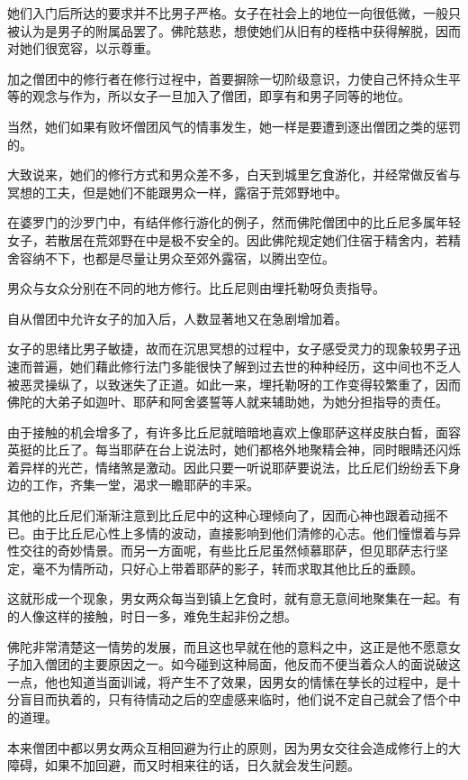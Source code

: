 \documentclass[twoside,openany]{book}
\begin{document}
她们入门后所达的要求并不比男子严格。女子在社会上的地位一向很低微，一般只被认为是男子的附属品罢了。佛陀慈悲，想使她们从旧有的桎梏中获得解脱，因而对她们很宽容，以示尊重。

加之僧团中的修行者在修行过裎中，首要摒除一切阶级意识，力使自己怀持众生平等的观念与作为，所以女子一旦加入了僧团，即享有和男子同等的地位。

当然，她们如果有败坏僧团风气的情事发生，她一样是要遭到逐出僧团之类的惩罚的。

大致说来，她们的修行方式和男众差不多，白天到城里乞食游化，并经常做反省与冥想的工夫，但是她们不能跟男众一样，露宿于荒郊野地中。

在婆罗门的沙罗门中，有结伴修行游化的例子，然而佛陀僧团中的比丘尼多属年轻女子，若散居在荒郊野在中是极不安全的。因此佛陀规定她们住宿于精舍内，若精舍容纳不下，也都是尽量让男众至郊外露宿，以腾出空位。

男众与女众分别在不同的地方修行。比丘尼则由埋托勒呀负责指导。

自从僧团中允许女子的加入后，人数显著地又在急剧增加着。

女子的思绪比男子敏捷，故而在沉思冥想的过程中，女子感受灵力的现象较男子迅速而普遍，她们藉此修行法门多能很快了解到过去世的种种经历，这中间也不乏人被恶灵操纵了，以致迷失了正道。如此一来，埋托勒呀的工作变得较繁重了，因而佛陀的大弟子如迦叶、耶萨和阿舍婆誓等人就来辅助她，为她分担指导的责任。

由于接触的机会增多了，有许多比丘尼就暗暗地喜欢上像耶萨这样皮肤白晳，面容英挺的比丘了。每当耶萨在台上说法时，她们都格外地聚精会神，同时眼睛还闪烁着异样的光芒，情绪煞是激动。因此只要一听说耶萨要说法，比丘尼们纷纷丢下身边的工作，齐集一堂，渴求一瞻耶萨的丰采。

其他的比丘尼们渐渐注意到比丘尼中的这种心理倾向了，因而心神也跟着动摇不已。由于比丘尼心性上多情的波动，直接影响到他们清修的心志。他们憧憬着与异性交往的奇妙情景。而另一方面呢，有些比丘尼虽然倾慕耶萨，但见耶萨志行坚定，毫不为情所动，只好心上带着耶萨的影子，转而求取其他比丘的垂顾。

这就形成一个现象，男女两众每当到镇上乞食时，就有意无意间地聚集在一起。有的人像这样的接触，时日一多，难免生起非份之想。

佛陀非常清楚这一情势的发展，而且这也早就在他的意料之中，这正是他不愿意女子加入僧团的主要原因之一。如今碰到这种局面，他反而不便当着众人的面说破这一点，他也知道当面训诫，将产生不了效果，因男女的情愫在孳长的过程中，是十分盲目而执着的，只有待情动之后的空虚感来临时，他们说不定自己就会了悟个中的道理。

本来僧团中都以男女两众互相回避为行止的原则，因为男女交往会造成修行上的大障碍，如果不加回避，而又时相来往的话，日久就会发生问题。
\end{document}

